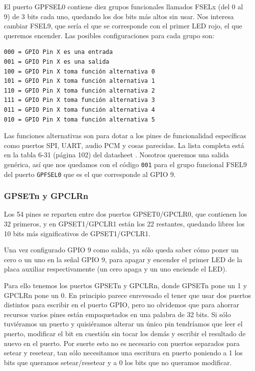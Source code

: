 El puerto GPFSEL0 contiene diez grupos funcionales
llamados FSELx (del 0 al 9) de 3 bits cada uno, quedando los dos bits
más altos sin usar. Nos interesa cambiar FSEL9, que sería el que se corresponde
con el primer LED rojo, el que queremos encender. Las posibles
configuraciones para cada grupo son:

\begin{lstlisting}
000 = GPIO Pin X es una entrada
001 = GPIO Pin X es una salida
100 = GPIO Pin X toma función alternativa 0
101 = GPIO Pin X toma función alternativa 1
110 = GPIO Pin X toma función alternativa 2
111 = GPIO Pin X toma función alternativa 3
011 = GPIO Pin X toma función alternativa 4
010 = GPIO Pin X toma función alternativa 5
\end{lstlisting}

Las funciones alternativas son para dotar a los pines de funcionalidad específicas
como puertos SPI, UART, audio PCM y cosas parecidas. La lista completa
está en la tabla 6-31 (página 102) del datasheet \cite{ARMP}. Nosotros queremos una salida
genérica, así que nos quedamos con el código {\tt 001} para el grupo funcional FSEL9 del
puerto {\tt GPFSEL0} que es el que corresponde al GPIO 9.


\subsubsection{GPSETn y GPCLRn}

Los 54 pines se reparten entre dos
puertos GPSET0/GPCLR0, que contienen los 32 primeros, y en GPSET1/GPCLR1 están los 22
restantes, quedando libres los 10 bits más significativos de GPSET1/GPCLR1.

Una vez configurado GPIO 9 como salida, ya sólo queda saber cómo poner un cero o un
uno en la señal GPIO 9, para apagar y encender el primer LED de la placa auxiliar
respectivamente (un cero apaga y un uno enciende el LED).

Para ello tenemos los puertos GPSETn y GPCLRn, donde GPSETn pone un 1 y GPCLRn pone
un 0. En principio parece enrevesado el tener
que usar dos puertos distintos para escribir en el puerto GPIO, pero no olvidemos que
para ahorrar recursos varios pines están empaquetados en una palabra de 32 bits. Si
sólo tuviéramos un puerto y quisiéramos alterar un único pin tendríamos que leer el
puerto, modificar el bit en cuestión sin tocar los demás y escribir el resultado de
nuevo en el puerto. Por suerte esto no es necesario con puertos separados para setear
y resetear, tan sólo necesitamos una escritura en puerto poniendo a 1 los bits que
queramos setear/resetear y a 0 los bits que no queramos modificar.

